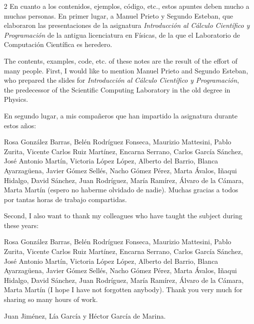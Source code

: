 \begin{paracol}{2}
\switchcolumn
En cuanto a los contenidos, ejemplos, código, etc., estos apuntes deben mucho a muchas personas. En primer lugar, a Manuel Prieto y Segundo Esteban, que elaboraron las presentaciones de la asignatura \emph{Introducción al Cálculo Científico y Programación} de la antigua licenciatura en Físicas, de la que el Laboratorio de Computación Científica es heredero.

\switchcolumn
The contents, examples, code, etc. of these notes are the result of the effort of many people. First, I would like to mention Manuel Prieto and Segundo Esteban, who prepared the slides for \emph{Introducción al Cálculo Científico y Programación}, the predecessor of the Scientific Computing Laboratory in the old degree in Physics.

\switchcolumn
En segundo lugar, a mis compañeros que han impartido la asignatura durante estos años:

Rosa González Barras, Belén Rodríguez Fonseca, Maurizio Mattesini, Pablo Zurita, Vicente Carlos Ruiz Martínez, Encarna Serrano, Carlos García Sánchez, José Antonio Martín, Victoria López López, Alberto del Barrio, Blanca Ayarzagüena, Javier Gómez Sellés, Nacho Gómez Pérez, Marta Ávalos, Iñaqui Hidalgo, David Sánchez, Juan Rodríguez, María Ramírez, Álvaro de la Cámara, Marta Martín (espero no haberme olvidado de nadie). Muchas gracias a todos por tantas horas de trabajo compartidas.

\switchcolumn
Second, I also want to thank my colleagues who have taught the subject during these years:

Rosa González Barras, Belén Rodríguez Fonseca, Maurizio Mattesini, Pablo Zurita, Vicente Carlos Ruiz Martínez, Encarna Serrano, Carlos García Sánchez, José Antonio Martín, Victoria López López, Alberto del Barrio, Blanca Ayarzagüena, Javier Gómez Sellés, Nacho Gómez Pérez, Marta Ávalos, Iñaqui Hidalgo, David Sánchez, Juan Rodríguez, María Ramírez, Álvaro de la Cámara, Marta Martín (I hope I have not forgotten anybody). Thank you very much for sharing so many hours of work.

\end{paracol}
\begin{flushright}
Juan Jiménez, Lía García y Héctor García de Marina.
\end{flushright}
\fussy
